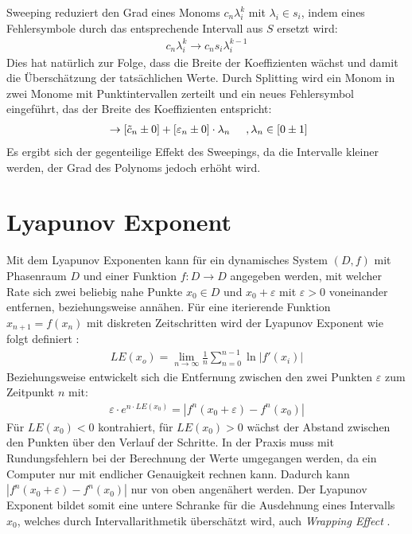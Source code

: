 Sweeping reduziert den Grad eines Monoms $c_n \lambda_i^k$ mit $\lambda_i \in s_i$, indem eines Fehlersymbole durch das entsprechende Intervall aus $S$ ersetzt wird: 
\begin{align*}
 c_n \lambda_i^k \rightarrow c_n s_i \lambda_i^{k-1}
\end{align*}
Dies hat natürlich zur Folge, dass die Breite der Koeffizienten wächst und damit die Überschätzung der tatsächlichen Werte. Durch Splitting wird ein Monom in zwei Monome mit Punktintervallen zerteilt und ein neues Fehlersymbol eingeführt, das der Breite des Koeffizienten entspricht:
\begin{align*}
 [\tilde{c}_n \pm \varepsilon_n]\ \rightarrow [\tilde{c}_n \pm 0] + [\varepsilon_n \pm 0]\cdot  \lambda_n \hspace{0.5cm}, \lambda_n \in [0 \pm 1]
\end{align*}
Es ergibt sich der gegenteilige Effekt des Sweepings, da die Intervalle kleiner werden, der Grad des Polynoms jedoch erhöht wird.





\section{Lyapunov Exponent}
Mit dem Lyapunov Exponenten kann für ein dynamisches System $(D,f)$ mit Phasenraum $D$ und einer Funktion $f: D \rightarrow D$ angegeben werden, mit welcher Rate sich zwei beliebig nahe Punkte $x_0 \in D$ und $x_0 + \varepsilon$ mit $\varepsilon > 0$ voneinander entfernen, beziehungsweise annähen. Für eine iterierende Funktion $x_{n+1} = f(x_n)$ mit diskreten Zeitschritten wird der Lyapunov Exponent wie folgt definiert \cite{Plaschko1989}:
\begin{align}
 LE(x_o) = \lim_{n \rightarrow \infty} \frac{1}{n} \sum_{n=0}^{n-1} \ln |f'(x_i)|
\end{align}
Beziehungsweise entwickelt sich die Entfernung zwischen den zwei Punkten $\varepsilon$ zum Zeitpunkt $n$ mit:
\begin{align}
 \varepsilon \cdot e^{n\cdot LE(x_0)} = |f^n(x_0 + \varepsilon) - f^n(x_0)|
\end{align}
Für $LE(x_0)<0$ kontrahiert, für $LE(x_0)>0$ wächst der Abstand zwischen den Punkten über den Verlauf der Schritte. In der Praxis muss mit Rundungsfehlern bei der Berechnung der Werte umgegangen werden, da ein Computer nur mit endlicher Genauigkeit rechnen kann. Dadurch kann $|f^n(x_0 + \varepsilon) - f^n(x_0)|$ nur von oben angenähert werden. Der Lyapunov Exponent bildet somit eine untere Schranke für die Ausdehnung eines Intervalls $x_0$, welches durch Intervallarithmetik überschätzt wird, auch \textit{Wrapping Effect} \cite{DBLP:conf/macis/BrausseKM15}.


